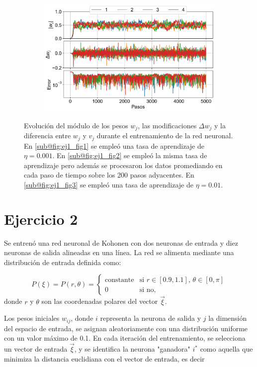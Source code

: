 \documentclass[aps,prb,twocolumn,superscriptaddress,floatfix,longbibliography]{revtex4-2}
\begin{document}
\begin{figure}
\begin{subfigure}[b]{0.3\textwidth}
        \includegraphics[width=\textwidth]{ej1_fig3.png}
        \caption{\label{fig:ej1_fig3}}
    \end{subfigure}
       \caption{Evolución del módulo de los pesos $w_j$, las modificaciones $\Delta w_j$ y la diferencia entre $w_j$ y $v_j$ durante el entrenamiento de la red neuronal. En \ref{sub@fig:ej1_fig1} se empleó una tasa de aprendizaje de $\eta = 0.001$. En \ref{sub@fig:ej1_fig2} se empleó la misma tasa de aprendizaje pero además se procesaron los datos promediando en cada paso de tiempo sobre los 200 pasos adyacentes. En \ref{sub@fig:ej1_fig3} se empleó una tasa de aprendizaje de $\eta = 0.01$.}
       \label{fig:three graphs}
  \end{figure}

\section*{Ejercicio 2}

Se entrenó una red neuronal de Kohonen con dos neuronas de entrada y diez neuronas de salida alineadas en una línea. La red se alimenta mediante una distribución de entrada definida como:

\[ P(\xi) = P(r, \theta) = 
  \begin{cases} 
   \text{constante} & \text{si } r \in [0.9, 1.1], \, \theta \in [0, \pi] \\
   0 & \text{si no},
  \end{cases} \]
donde $r$ y $\theta$ son las coordenadas polares del vector $\vec{\xi}$.

Los pesos iniciales \(w_{ij}\), donde \(i\) representa la neurona de salida y \(j\) la dimensión del espacio de entrada, se asignan aleatoriamente con una distribución uniforme con un valor máximo de 0.1. En cada iteración del entrenamiento, se selecciona un vector de entrada \(\vec{\xi}\), y se identifica la neurona "ganadora" \(i^*\) como aquella que minimiza la distancia euclidiana con el vector de entrada, es decir
\end{document}

